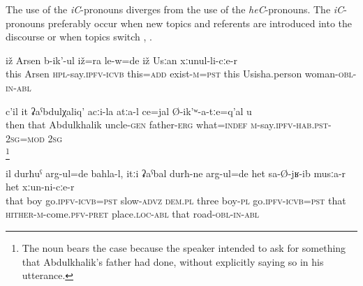 The use of the \textit{iC}-pronouns diverges from the use of the \textit{heC}-pronouns. The \textit{iC}-pronouns preferably occur when new topics and referents are introduced into the discourse  or when topics switch , .
%
\begin{exe}
	\ex	\label{And this man called Arsen, he was also there, with his wife from Usisha.}
	\gll	iž	Arsen	b-ik'-ul	iž=ra	le-w=de	iž	Usːan	xːunul-li-cːe-r\\
	this	Arsen	\textsc{hpl}-say.\textsc{ipfv}-\textsc{icvb} this=\textsc{add}	exist-\textsc{m}=\textsc{pst}	this	Usisha.person	woman-\textsc{obl}-\textsc{in}-\textsc{abl}\\
	\glt	{}

		\label{What did you say about uncle Abdulkhalik's father?}
	\sn
	\gll	c'il	it	ʡaˁbdulχaliq'	acːi-la	atːa-l	ce=jal	Ø-ik'ʷ-a-tːe=q'al	u\\
		then	that	Abdulkhalik	uncle-\textsc{gen}	father-\textsc{erg}	what=\textsc{indef}	\textsc{m}-say.\textsc{ipfv}-\textsc{hab}.\textsc{pst}-\textsc{2sg}=\textsc{mod}	\textsc{2sg}\\
	\glt	{}\footnote{The noun  bears the  case because the speaker intended to ask for something that Abdulkhalik's father had done, without explicitly saying so in his utterance.}

		\label{And the boy went slowly away, and the three boys went there to that place, on that road.}
	\sn
	\gll	il	durħuˁ	arg-ul=de	bahla-l,	itːi	ʡaˁbal	durħ-ne	arg-ul=de	het	sa-Ø-jʁ-ib	musːa-r het	xːun-ni-cːe-r\\
		that	boy	go.\textsc{ipfv}-\textsc{icvb}=\textsc{pst}	slow-\textsc{advz}	\textsc{dem.pl} three	boy-\textsc{pl}	go.\textsc{ipfv}-\textsc{icvb}=\textsc{pst}	that \textsc{hither-m}-come.\textsc{pfv}-\textsc{pret} place.\textsc{loc}-\textsc{abl} that	road-\textsc{obl-in}-\textsc{abl} \\
	\glt	{}

\end{exe}

